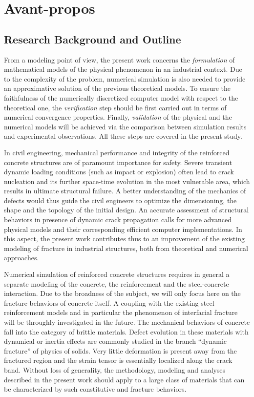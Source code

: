\chapter{Avant-propos}

\section*{Research Background and Outline}
From a modeling point of view, the present work concerns the \emph{formulation} of mathematical models of the physical phenomenon in an industrial context. Due to the complexity of the problem, numerical simulation is also needed to provide an approximative solution of the previous theoretical models. To ensure the faithfulness of the numerically discretized computer model with respect to the theoretical one, the \emph{verification} step should be first carried out in terms of numerical convergence properties. Finally, \emph{validation} of the physical and the numerical models will be achieved via the comparison between simulation results and experimental observations. All these steps are covered in the present study.

In civil engineering, mechanical performance and integrity of the reinforced concrete structures are of paramount importance for safety. Severe transient dynamic loading conditions (such as impact or explosion) often lead to crack nucleation and its further space-time evolution in the most vulnerable area, which results in ultimate structural failure. A better understanding of the mechanics of defects would thus guide the civil engineers to optimize the dimensioning, the shape and the topology of the initial design. An accurate assessment of structural behaviors in presence of dynamic crack propagation calls for more advanced physical models and their corresponding efficient computer implementations. In this aspect, the present work contributes thus to an improvement of the existing modeling of fracture in industrial structures, both from theoretical and numerical approaches.

Numerical simulation of reinforced concrete structures requires in general a separate modeling of the concrete, the reinforcement and the steel-concrete interaction. Due to the broadness of the subject, we will only focus here on the fracture behaviors of concrete itself. A coupling with the existing steel reinforcement models and in particular the phenomenon of interfacial fracture will be throughly investigated in the future. The mechanical behaviors of concrete fall into the category of brittle materials. Defect evolution in these materials with dynamical or inertia effects are commonly studied in the branch ``dynamic fracture'' of physics of solids. Very little deformation is present away from the fractured region and the strain tensor is essentially localized along the crack band. Without loss of generality, the methodology, modeling and analyses described in the present work should apply to a large class of materials that can be characterized by such constitutive and fracture behaviors.

